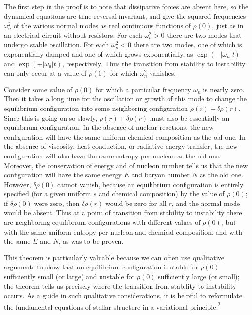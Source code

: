 The first step in the proof is to note that dissipative forces are absent
here, so the dynamical equations are time-reversal-invariant, and give the
squared frequencies \(\omega_n^2\) of the various normal modes as real
continuous functions of \(\rho(0)\), just as in an electrical circuit without
resistors. For each \(\omega_n^2>0\) there are two modes that undergo stable
oscillation. For each \(\omega_n^2<0\) there are two modes, one of which is
exponentially damped and one of which grows exponentially, as
\(\exp(-|\omega_n|t)\) and \(\exp(+|\omega_n|t)\), respectively. Thus the
transition from stability to instability can only occur at a value of
\(\rho(0)\) for which \(\omega_n^2\) vanishes.

Consider some value of \(\rho(0)\) for which a particular frequency
\(\omega_n\) is nearly zero. Then it takes a long time for the oscillation or
growth of this mode to change the equilibrium configuration into some
neighboring configuration \(\rho(r)+\delta\rho(r)\). Since this is going on
so slowly, \(\rho(r)+\delta\rho(r)\) must also be essentially an equilibrium
configuration. In the absence of nuclear reactions, the new configuration
will have the same uniform chemical composition as the old one. In the
absence of viscosity, heat conduction, or radiative energy transfer, the new
configuration will also have the same entropy per nucleon as the old one.
Moreover, the conservation of energy and of nucleon number tells us that the
new configuration will have the same energy \(E\) and baryon number \(N\) as
the old one. However, \(\delta\rho(0)\) cannot vanish, because an equilibrium
configuration is entirely specified (for a given uniform \(s\) and chemical
composition) by the value of \(\rho(0)\); if \(\delta\rho(0)\) were zero, then
\(\delta\rho(r)\) would be zero for all \(r\), and the normal mode would be
absent. Thus at a point of transition from stability to instability there are
neighboring equilibrium configurations with different values of \(\rho(0)\),
but with the same uniform entropy per nucleon and chemical composition, and
with the same \(E\) and \(N\), as was to be proven.

This theorem is particularly valuable because we can often use qualitative
arguments to show that an equilibrium configuration is stable for \(\rho(0)\)
sufficiently small (or large) and unstable for \(\rho(0)\) sufficiently large
(or small); the theorem tells us precisely where the transition from stability
to instability occurs. As a guide in such qualitative considerations, it is
helpful to reformulate the fundamental equations of stellar structure in a
variational principle.\hyperref[ch11-ref-2]{\textsuperscript{2}}

